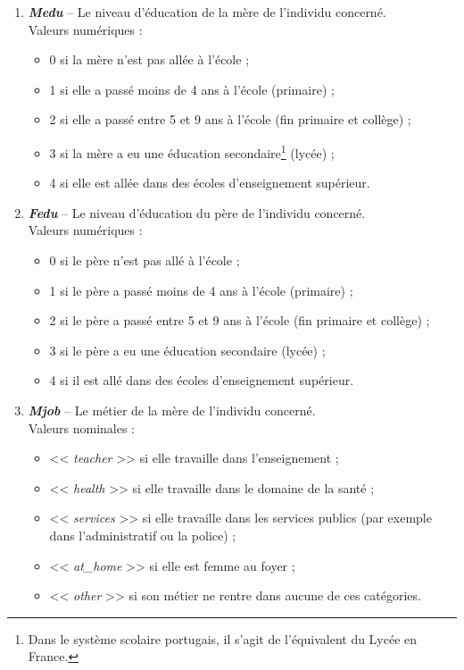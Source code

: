 \documentclass[11pt]{article}
\begin{document}
\begin{enumerate}
\item \textbf{\emph{Medu}} \--- \label{rap1}Le niveau d'éducation de la mère de l'individu concerné. 
	\\\textsf{Valeurs numériques : }\begin{itemize}
	\item[\textbullet] 0 si la mère n'est pas allée à l'école ;
	\item[\textbullet] 1 si elle a passé moins de 4 ans à l'école (primaire) ;
	\item[\textbullet] 2 si elle a passé entre 5 et 9 ans à l'école (fin primaire et collège) ;
	\item[\textbullet] 3 si la mère a eu une éducation secondaire\footnote{Dans le système scolaire portugais, il s'agit de l'équivalent du Lycée en France.} (lycée) ;
	\item[\textbullet] 4 si elle est allée dans des écoles d'enseignement supérieur.
	\end{itemize}

\item \textbf{\emph{Fedu}} \--- Le niveau d'éducation du père de l'individu concerné.
	\\\textsf{Valeurs numériques : }\begin{itemize}
	\item[\textbullet] 0 si le père n'est pas allé à l'école ;
	\item[\textbullet] 1 si le père a passé moins de 4 ans à l'école (primaire) ;
	\item[\textbullet] 2 si le père a passé entre 5 et 9 ans à l'école (fin primaire et collège) ;
	\item[\textbullet] 3 si le père a eu une éducation secondaire (lycée) ;
	\item[\textbullet] 4 si il est allé dans des écoles d'enseignement supérieur.
	\end{itemize}

\item \textbf{\emph{Mjob}} \--- \label{rap2} Le métier de la mère de l'individu concerné.
	\\\textsf{Valeurs nominales : }\begin{itemize}
	\item[\textbullet] << \emph{teacher} >> si elle travaille dans l'enseignement ;
	\item[\textbullet] << \emph{health} >> si elle travaille dans le domaine de la santé ;
	\item[\textbullet] << \emph{services} >> si elle travaille dans les services publics (par exemple dans  l'administratif ou la police) ;
	\item[\textbullet] << \emph{at\_home} >> si elle est femme au foyer ;
	\item[\textbullet] << \emph{other} >> si son métier ne rentre dans aucune de ces catégories.
	\end{itemize}


\end{enumerate}
\end{document}
